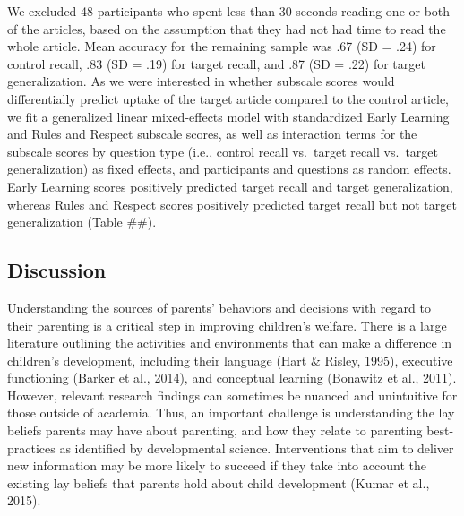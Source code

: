 \documentclass[10pt, letterpaper]{article}
\begin{document}
We excluded 48 participants who spent less than 30 seconds reading one
or both of the articles, based on the assumption that they had not had
time to read the whole article. Mean accuracy for the remaining sample
was .67 (SD = .24) for control recall, .83 (SD = .19) for target recall,
and .87 (SD = .22) for target generalization. As we were interested in
whether subscale scores would differentially predict uptake of the
target article compared to the control article, we fit a generalized
linear mixed-effects model with standardized Early Learning and Rules
and Respect subscale scores, as well as interaction terms for the
subscale scores by question type (i.e., control recall vs.~target recall
vs.~target generalization) as fixed effects, and participants and
questions as random effects. Early Learning scores positively predicted
target recall and target generalization, whereas Rules and Respect
scores positively predicted target recall but not target generalization
(Table \#\#).

\subsection{Discussion}\label{discussion}

Understanding the sources of parents' behaviors and decisions with
regard to their parenting is a critical step in improving children's
welfare. There is a large literature outlining the activities and
environments that can make a difference in children's development,
including their language (Hart \& Risley, 1995), executive functioning
(Barker et al., 2014), and conceptual learning (Bonawitz et al., 2011).
However, relevant research findings can sometimes be nuanced and
unintuitive for those outside of academia. Thus, an important challenge
is understanding the lay beliefs parents may have about parenting, and
how they relate to parenting best-practices as identified by
developmental science. Interventions that aim to deliver new information
may be more likely to succeed if they take into account the existing lay
beliefs that parents hold about child development (Kumar et al., 2015).
\end{document}
